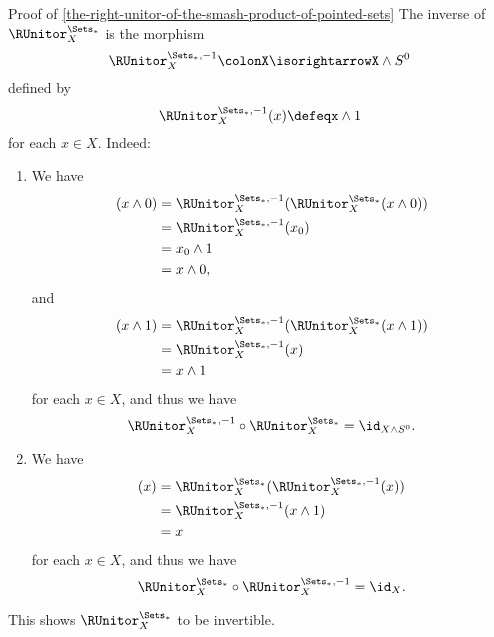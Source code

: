\begin{Proof}{Proof of \cref{the-right-unitor-of-the-smash-product-of-pointed-sets}}
    The inverse of $\RUnitor^{\Sets_{*}}_{X}$ is the morphism
    \[
        \RUnitor^{\Sets_{*},-1}_{X}%
        \colon%
        X%
        \isorightarrow%
        X\wedge S^{0}%
    \]%
    defined by
    \[
        \RUnitor^{\Sets_{*},-1}_{X}(x)%
        \defeq%
        x\wedge 1
    \]%
    for each $x\in X$. Indeed:
    \begin{enumerate}
        \item\label{proof-of-the-right-unitor-of-the-smash-product-of-pointed-sets-3}We have
            \begin{align*}
                [\RUnitor^{\Sets_{*},-1}_{X}\circ\RUnitor^{\Sets_{*}}_{X}](x\wedge 0) &= \RUnitor^{\Sets_{*},-1}_{X}(\RUnitor^{\Sets_{*}}_{X}(x\wedge 0))\\
                                                                                      &= \RUnitor^{\Sets_{*},-1}_{X}(x_{0})\\
                                                                                      &= x_{0}\wedge 1\\
                                                                                      &= x\wedge 0,
            \end{align*}
            and 
            \begin{align*}
                [\RUnitor^{\Sets_{*},-1}_{X}\circ\RUnitor^{\Sets_{*}}_{X}](x\wedge 1) &= \RUnitor^{\Sets_{*},-1}_{X}(\RUnitor^{\Sets_{*}}_{X}(x\wedge 1))\\
                                                                                      &= \RUnitor^{\Sets_{*},-1}_{X}(x)\\
                                                                                      &= x\wedge 1
            \end{align*}
            for each $x\in X$, and thus we have
            \[
                \RUnitor^{\Sets_{*},-1}_{X}%
                \circ%
                \RUnitor^{\Sets_{*}}_{X}%
                =%
                \id_{X\wedge S^{0}}.%
            \]%
        \item\label{proof-of-the-right-unitor-of-the-smash-product-of-pointed-sets-4}We have
            \begin{align*}
                [\RUnitor^{\Sets_{*}}_{X}\circ\RUnitor^{\Sets_{*},-1}_{X}](x) &= \RUnitor^{\Sets_{*}}_{X}(\RUnitor^{\Sets_{*},-1}_{X}(x))\\
                                                                              &= \RUnitor^{\Sets_{*},-1}_{X}(x\wedge 1)\\
                                                                              &= x
            \end{align*}
            for each $x\in X$, and thus we have
            \[
                \RUnitor^{\Sets_{*}}_{X}%
                \circ%
                \RUnitor^{\Sets_{*},-1}_{X}%
                =%
                \id_{X}.%
            \]%
    \end{enumerate}
    This shows $\RUnitor^{\Sets_{*}}_{X}$ to be invertible.


\end{Proof}
